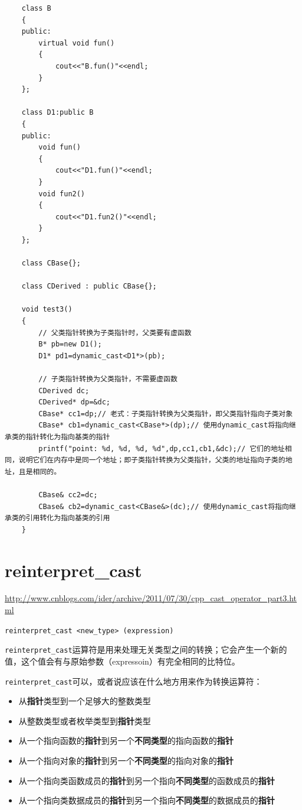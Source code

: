 \documentclass[UTF8,a4paper,12pt]{ctexbook} %
\begin{document}
	\begin{lstlisting}
	class B
	{
	public:
		virtual void fun()
		{
			cout<<"B.fun()"<<endl;
		}
	};   
	
	class D1:public B
	{
	public:
		void fun()
		{
			cout<<"D1.fun()"<<endl;
		}
		void fun2()
		{
			cout<<"D1.fun2()"<<endl;
		}
	};   

	class CBase{};
	 
	class CDerived : public CBase{};
	
	void test3()   
	{    
		// 父类指针转换为子类指针时，父类要有虚函数
		B* pb=new D1();   
		D1* pd1=dynamic_cast<D1*>(pb);
		
		// 子类指针转换为父类指针，不需要虚函数
		CDerived dc;   
		CDerived* dp=&dc;   
		CBase* cc1=dp;// 老式：子类指针转换为父类指针，即父类指针指向子类对象   
		CBase* cb1=dynamic_cast<CBase*>(dp);// 使用dynamic_cast将指向继承类的指针转化为指向基类的指针   
		printf("point: %d, %d, %d, %d",dp,cc1,cb1,&dc);// 它们的地址相同，说明它们在内存中是同一个地址；即子类指针转换为父类指针，父类的地址指向子类的地址，且是相同的。   
		
		CBase& cc2=dc;   
		CBase& cb2=dynamic_cast<CBase&>(dc);// 使用dynamic_cast将指向继承类的引用转化为指向基类的引用   
	}
	\end{lstlisting} 
\section{reinterpret\_cast}
		\url{http://www.cnblogs.com/ider/archive/2011/07/30/cpp_cast_operator_part3.html}
		
		\verb|reinterpret_cast <new_type> (expression)|
		
		\verb|reinterpret_cast|运算符是用来处理无关类型之间的转换；它会产生一个新的值，这个值会有与原始参数（expressoin）有完全相同的比特位。

		\verb|reinterpret_cast|可以，或者说应该在什么地方用来作为转换运算符：
		\begin{itemize}
			\item 从\textbf{指针}类型到一个足够大的整数类型
			\item 从整数类型或者枚举类型到\textbf{指针}类型
			\item 从一个指向函数的\textbf{指针}到另一个\textbf{不同类型}的指向函数的\textbf{指针}
			\item 从一个指向对象的\textbf{指针}到另一个\textbf{不同类型}的指向对象的\textbf{指针}
			\item 从一个指向类函数成员的\textbf{指针}到另一个指向\textbf{不同类型}的函数成员的\textbf{指针}
			\item 从一个指向类数据成员的\textbf{指针}到另一个指向\textbf{不同类型}的数据成员的\textbf{指针}
		\end{itemize}
		
\end{document}
